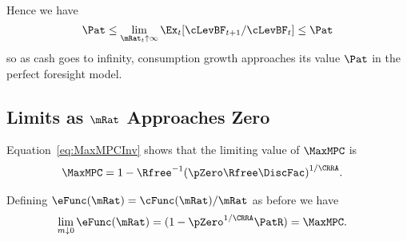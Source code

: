 \documentclass[BufferStockTheory]{subfiles}
\begin{document}
Hence we have
\begin{equation*}
  {\Pat}  \leq \lim_{\mRat_{t} \uparrow \infty} \Ex_{t}[\cLevBF_{t+1}/\cLevBF_{t}] \leq {\Pat}
\end{equation*}
so as cash goes to infinity, consumption growth approaches its
value $\Pat$ in the perfect foresight model.

\begin{comment}
  Of course, the constraint never becomes irrelevant if human wealth is
  infinite.  We ruled out infinite human wealth at the beginning of this
  section by assuming $\Rfree> \PGro$.  If this finite human wealth
  condition does not hold, it is possible to show that for any finite
  horizon consumer the marginal propensity to consume approaches the
  finite-horizon perfect foresight MPC as wealth approaches infinity.
  However, as the horizon gets longer, the perfect foresight MPC
  approaches zero.  It can be shown therefore that the limiting MPC for
  the converged consumption function approaches (but never reaches)
  zero.  (This is why we chose $\MinMinMPC=0$ if the \FHWC~fails
  in the proofs above.)
\end{comment}

\hypertarget{LimitsAsmtToZero}{}
\subsection{Limits as \texorpdfstring{$\mRat$}{m} Approaches Zero}\label{subsec:LimitsAsmtToZero}

Equation~\eqref{eq:MaxMPCInv} shows that the limiting value of
$\MaxMPC$ is
\begin{align*}
  \MaxMPC  & = 1-{\Rfree}^{-1}{(\pZero  \Rfree\DiscFac)}^{1/\CRRA}.
\end{align*}

Defining $\eFunc(\mRat)=\cFunc(\mRat)/\mRat$ as before we have
\begin{align*}
  \lim_{m \downarrow 0} \eFunc(\mRat)  & = (1-\pZero^{1/\CRRA}\PatR) = \MaxMPC .
\end{align*}
\end{document}
